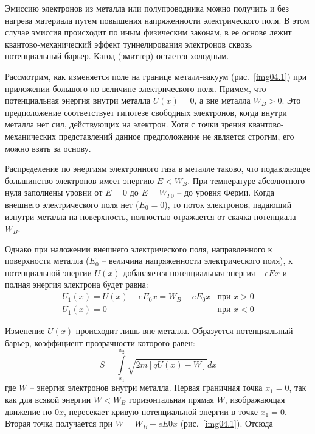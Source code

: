 
Эмиссию электронов из металла или полупроводника можно получить и без нагрева 
материала путем повышения напряженности электрического поля. В этом случае 
эмиссия происходит по иным физическим законам, в ее основе лежит 
квантово-механический эффект туннелирования электронов сквозь потенциальный 
барьер. Катод (эмиттер) остается холодным.

Рассмотрим, как изменяется поле на границе металл-вакуум (рис.~\ref{img04.1}) 
при приложении большого по величине электрического поля. Примем, что 
потенциальная энергия внутри металла \( U(x) = 0 \), а вне металла 
\( W_B > 0 \). Это предположение соответствует гипотезе свободных электронов, 
когда внутри металла нет сил, действующих на электрон. Хотя с точки зрения 
квантово-механических представлений данное предположение не является строгим, 
его можно взять за основу.

Распределение по энергиям электронного газа в металле таково, что подавляющее 
большинство электронов имеет энергию \( E < W_B \). При температуре 
абсолютного нуля заполнены уровни от \( E = 0 \) до \( E = W_{F0} \) -- до 
уровня Ферми. Когда внешнего электрического поля нет (\( E_0 = 0 \)), то поток 
электронов, падающий изнутри металла на поверхность, полностью отражается от 
скачка потенциала \( W_B \).

Однако при наложении внешнего электрического поля, направленного к поверхности 
металла (\( E_0 \) -- величина напряженности электрического поля), к 
потенциальной энергии \( U(x) \) добавляется потенциальная энергия \( -eEx \) 
и полная энергия электрона будет равна:
\begin{equation}
	\begin{array}{cr}
		U_1(x) = U(x) - eE_0 x = W_B - eE_0 x & \text{при } x > 0 \\
		U_1(x) = 0 & \text{при } x < 0
	\end{array}
	\label{eq04.1.10}
\end{equation}
 
Изменение \( U(x) \) происходит лишь вне металла. Образуется потенциальный 
барьер, коэффициент прозрачности которого равен:
\begin{equation}
	S = \int\limits_{x_1}^{x_2} \sqrt{2m[qU(x)-W]}dx
	\label{eq04.1.11}
\end{equation}
где \( W \) -- энергия электронов внутри металла. Первая граничная точка 
\( x_1 = 0 \), так как для всякой энергии \( W < W_B \) горизонтальная прямая 
\( W \), изображающая движение по \( 0x \), пересекает кривую потенциальной 
энергии в точке \( x_1 = 0 \). Вторая точка получается при 
\( W = W_B - eE0x \) (рис.~\ref{img04.1}). Отсюда

